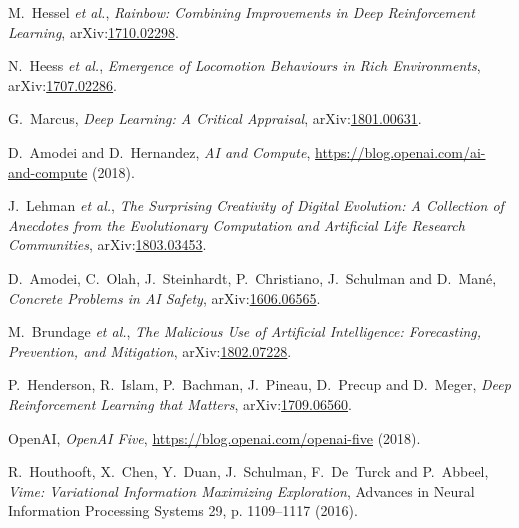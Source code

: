 \documentclass[11pt, a4paper]{report} %
\begin{document}
\begin{thebibliography}{99}
M.~Hessel \textit{et al.}, \textit{Rainbow: Combining Improvements in Deep Reinforcement Learning}, arXiv:\href{https://arxiv.org/abs/1710.02298}{1710.02298}.



N.~Heess \textit{et al.}, \textit{Emergence of Locomotion Behaviours in Rich Environments}, arXiv:\href{https://arxiv.org/abs/1707.02286}{1707.02286}.



G.~Marcus, \textit{Deep Learning: A Critical Appraisal}, arXiv:\href{https://arxiv.org/abs/1801.00631}{1801.00631}. 




D.~Amodei and D.~Hernandez, \textit{AI and Compute}, \href{https://blog.openai.com/ai-and-compute}{https://blog.openai.com/ai-and-compute} (2018).


J.~Lehman \textit{et al.}, \textit{The Surprising Creativity of Digital Evolution: A Collection of Anecdotes from the Evolutionary Computation and Artificial Life Research Communities}, arXiv:\href{https://arxiv.org/abs/1803.03453}{1803.03453}. 




D.~Amodei, C.~Olah, J.~Steinhardt, P.~Christiano, J.~Schulman and D.~Mané, \textit{Concrete Problems in AI Safety}, arXiv:\href{https://arxiv.org/abs/1606.06565}{1606.06565}. 




M.~Brundage \textit{et al.}, \textit{The Malicious Use of Artificial Intelligence: Forecasting, Prevention, and Mitigation}, arXiv:\href{https://arxiv.org/abs/1802.07228}{1802.07228}. 




P.~Henderson, R.~Islam, P.~Bachman, J.~Pineau, D.~Precup and D.~Meger, \textit{Deep Reinforcement Learning that Matters}, arXiv:\href{https://arxiv.org/abs/1709.06560}{1709.06560}. 

OpenAI, \textit{OpenAI Five}, \href{https://blog.openai.com/openai-five}{https://blog.openai.com/openai-five} (2018).



R.~Houthooft, X.~Chen, Y.~Duan, J.~Schulman, F.~De~Turck and P.~Abbeel, \emph{Vime: Variational Information Maximizing Exploration}, Advances in Neural Information Processing Systems 29, p. 1109--1117 (2016).






\end{thebibliography}
\end{document}
